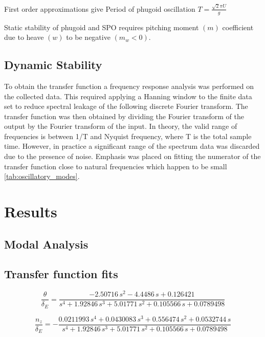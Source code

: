 \documentclass{article}
\begin{document}
First order approximations give
Period of phugoid oscillation $T = \frac{\sqrt{2} \pi U}{g}$

Static stability of phugoid and SPO requires pitching moment $(m)$ coefficient due to heave $(w)$ to be negative $(m_w < 0)$.


\subsection{Dynamic Stability}


To obtain the transfer function a frequency response analysis was performed on the collected data.
This required applying a Hanning window to the finite data set to reduce spectral leakage of the following discrete Fourier transform.
The transfer function was then obtained by dividing the Fourier transform of the output by the Fourier transform of the input.
In theory, the valid range of frequencies is between 1/T and Nyquist frequency, where T is the total sample time.
However, in practice a significant range of the spectrum data was discarded due to the presence of noise.
Emphasis was placed on fitting the numerator of the transfer function close to natural frequencies which happen to be small \ref{tab:oscillatory_modes}.

\section{Results}

\subsection{Modal Analysis}

\subsection{Transfer function fits}

\begin{equation}
    \frac{\theta}{\delta_E} =
    \frac{-2.50716\,s^2-4.4486\,s+0.126421}{s^4+1.92846\,s^3+5.01771\,s^2+0.105566\,s+0.0789498}
    \label{eq:pitch_elev}
\end{equation}

\begin{equation}
    \frac{n_z}{\delta_E} =
    -\frac{0.0211993\,s^4+0.0430083\,s^3+0.556474\,s^2+0.0532744\,s}{s^4+1.92846\,s^3+5.01771\,s^2+0.105566\,s+0.0789498}
    \label{eq:naccel_elev}
\end{equation}
\end{document}
